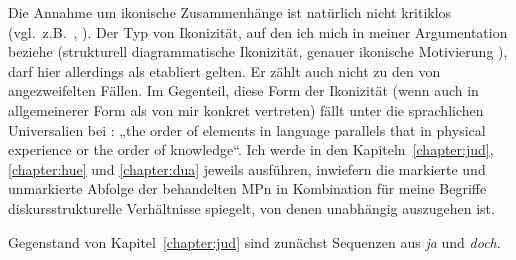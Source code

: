 Die Annahme um ikonische Zusammenhänge ist natürlich nicht kritiklos (vgl.\ z.B.\ \citealt{Haiman1983}, \citealt{Haspelmath2008a, Haspelmath2008b}). Der Typ von Ikonizität, auf den ich mich in meiner Argumentation beziehe (strukturell  diagrammatische Ikonizität, genauer ikonische Motivierung ), darf hier allerdings als etabliert gelten. Er zählt auch nicht zu den von \citet{Haspelmath2008a} angezweifelten Fällen. Im Gegenteil, diese Form der Ikonizität (wenn auch in allgemeinerer Form als von mir konkret vertre\-ten) fällt unter die sprachlichen Universalien  bei \citet[103]{Greenberg1963}: „the order of elements in language parallels that in physical experience or the order of know\-ledge“. Ich werde in den Kapiteln~\ref{chapter:jud}, \ref{chapter:hue} und \ref{chapter:dua} jeweils ausführen, inwiefern die markierte und unmarkierte Abfolge der behandelten MPn in Kombination für meine Begriffe diskursstrukturelle Verhältnisse spiegelt, von denen unabhängig auszugehen ist.  
 
Gegenstand von Kapitel~\ref{chapter:jud} sind zunächst Sequenzen aus \textit{ja} und \textit{doch}.









